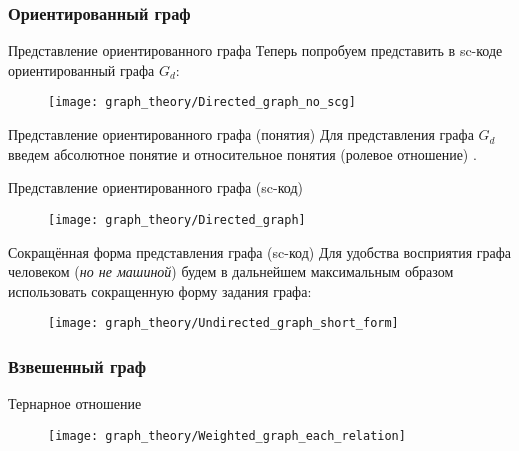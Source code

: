 \subsubsection{Ориентированный граф}

\begin{frame}{Представление ориентированного графа}
  Теперь попробуем представить в sc-коде ориентированный графа $G_d$:

  \begin{figure}
    \centering
    \texttt{[image: graph\_theory/Directed\_graph\_no\_scg]}
  \end{figure}
\end{frame}

\begin{frame}{Представление ориентированного графа (понятия)}
  Для представления графа $G_d$ введем абсолютное понятие
   и относительное понятия (ролевое отношение)
  .
\end{frame}

\begin{frame}{Представление ориентированного графа (sc-код)}
  \begin{figure}
    \centering
    \texttt{[image: graph\_theory/Directed\_graph]}
  \end{figure}
\end{frame}

\begin{frame}{Сокращённая форма представления графа (sc-код)}
  Для удобства восприятия графа человеком (\emph{но не машиной})
  будем в дальнейшем максимальным образом использовать сокращенную
  форму задания графа:
  
  \begin{figure}
    \centering
    \texttt{[image: graph\_theory/Undirected\_graph\_short\_form]}
  \end{figure}
\end{frame}

\subsubsection{Взвешенный граф}

\begin{frame}{Тернарное отношение }
  \begin{figure}
    \centering
    \texttt{[image: graph\_theory/Weighted\_graph\_each\_relation]}
  \end{figure}
\end{frame}


